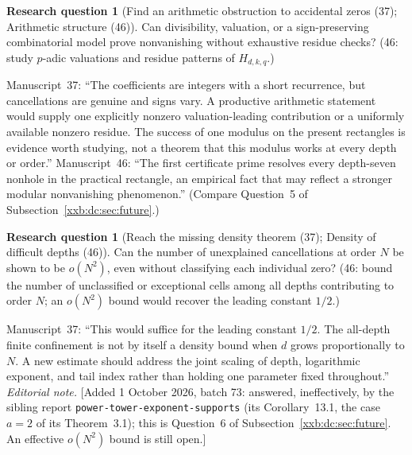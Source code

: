 \documentclass[11pt,a4paper]{article}
\numberwithin{equation}{section}
\theoremstyle{definition}
\newtheorem{question}[theorem]{Research question}
\theoremstyle{remark}
\theoremstyle{plain}
\newcommand{\sibPTE}{\texttt{power-\allowbreak{}tower-\allowbreak{}exponent-\allowbreak{}supports}}
\begin{document}
\begin{question}[Find an arithmetic obstruction to accidental zeros (37); Arithmetic structure (46)]\label{xxb:d78:q:arith}
Can divisibility, valuation, or a sign-preserving combinatorial model prove
nonvanishing without exhaustive residue checks?  (46: study $p$-adic
valuations and residue patterns of $H_{d,k,q}$.)
\end{question}
Manuscript~37: ``The coefficients are integers with a short recurrence, but
cancellations are genuine and signs vary. A productive arithmetic statement
would supply one explicitly nonzero valuation-leading contribution or a
uniformly available nonzero residue. The success of one modulus on the present
rectangles is evidence worth studying, not a theorem that this modulus works at
every depth or order.''  Manuscript~46: ``The first certificate prime resolves
every depth-seven nonhole in the practical rectangle, an empirical fact that
may reflect a stronger modular nonvanishing phenomenon.''  (Compare
Question~5 of Subsection~\ref{xxb:dc:sec:future}.)

\begin{question}[Reach the missing density theorem (37); Density of difficult depths (46)]\label{xxb:d78:q:density}
Can the number of unexplained cancellations at order $N$ be shown to be
$o(N^2)$, even without classifying each individual zero?  (46: bound the number
of unclassified or exceptional cells among all depths contributing to order
$N$; an $o(N^2)$ bound would recover the leading constant $1/2$.)
\end{question}
Manuscript~37: ``This would suffice for the leading constant $1/2$. The
all-depth finite confinement is not by itself a density bound when $d$ grows
proportionally to $N$. A new estimate should address the joint scaling of
depth, logarithmic exponent, and tail index rather than holding one parameter
fixed throughout.''
\emph{Editorial note.}  [Added 1 October 2026, batch 73: answered,
ineffectively, by the sibling report \sibPTE{} (its Corollary~13.1, the case
$a=2$ of its Theorem~3.1); this is Question~6 of
Subsection~\ref{xxb:dc:sec:future}.  An effective $o(N^2)$ bound is still
open.]
\end{document}
